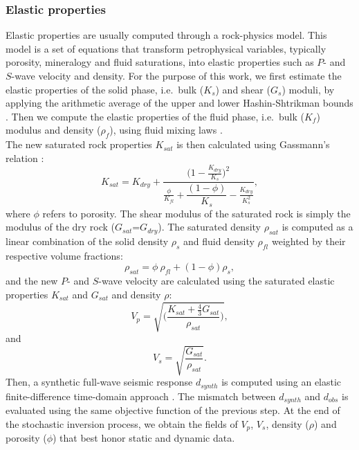 \subsubsection{Elastic properties}
\label{sc:elasticproperties}
Elastic properties are usually computed through a rock-physics model. This model
is a set of equations that transform petrophysical variables, typically
porosity, mineralogy and fluid saturations, into elastic properties such as $P$-
and $S$-wave velocity and density. For the purpose of this work, we first
estimate the elastic properties of the solid phase, i.e.\ bulk ($K_s$) and shear
($G_s$) moduli, by applying the arithmetic average of the upper and lower
Hashin-Shtrikman bounds \citep{Hashin1963}. Then we compute the elastic
properties of the fluid phase, i.e.\ bulk ($K_f$) modulus and density
($\rho_f$), using fluid mixing laws \citep{Wood1955,Brie1995}. \\
The new  saturated rock properties $K_{sat}$ is then calculated using
Gassmann's relation \cite{Gassmann}:
\begin{equation}
K_{sat} = K_{dry} + \dfrac{\bigg(1-\frac{K_{dry}}{K_s}\bigg)^2}{\frac{\phi}{K_{fl}}+\dfrac{(1-\phi)}{K_s}-\frac{K_{dry}}{K^2_s}},
\label{eq:gassmann}
\end{equation}
where $\phi$ refers to porosity. The shear modulus of the saturated rock is
simply the modulus of the dry rock ($G_{sat}$=$G_{dry}$).
The saturated density $\rho_{sat}$ is computed as a linear combination of the
solid density $\rho_s$ and fluid density $\rho_{fl}$ weighted by their
respective volume fractions:
\begin{equation}
\rho_{sat} = \phi\ \rho_{fl} + (1 - \phi)\rho_s,
\label{eq:rho2}
\end{equation}
and the new $P$- and $S$-wave velocity are calculated using the saturated
elastic properties $K_{sat}$ and $G_{sat}$ and density $\rho$:
\begin{equation}
\label{eq:Vp2}
V_p = \sqrt{\Bigg(\dfrac{K_{sat}+\tfrac{4}{3}G_{sat}}{\rho_{sat}}\Bigg)},
\end{equation}
and
\begin{equation}
\label{eq:Vs2}
V_s = \sqrt{\dfrac{G_{sat}}{\rho_{sat}}}.
\end{equation}
Then, a synthetic full-wave seismic response $d_{synth}$ is computed  using an
elastic finite-difference time-domain approach \cite{Bohlen2002}.
The mismatch between $d_{synth}$ and $d_{obs}$ is evaluated using the same
objective function of the previous step.
At the end of the stochastic inversion process, we obtain the fields of $V_p$,
$V_s$, density ($\rho$) and porosity ($\phi$) that best honor static and dynamic
data.
